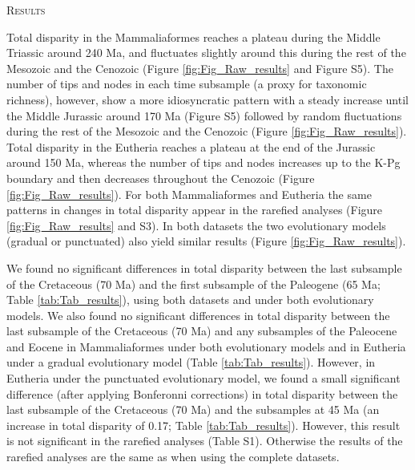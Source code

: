 \documentclass[12pt,letterpaper]{article}
\renewcommand{\section}[1]{%
\bigskip
\begin{center}
\begin{Large}
\normalfont\scshape #1
\medskip
\end{Large}
\end{center}}
\begin{document}
%
%

\section{Results}
Total disparity in the Mammaliaformes reaches a plateau during the Middle Triassic around 240 Ma, and fluctuates slightly around this during the rest of the Mesozoic and the Cenozoic (Figure \ref{fig:Fig_Raw_results} and Figure S5).
The number of tips and nodes in each time subsample (a proxy for taxonomic richness), however, show a more idiosyncratic pattern with a steady increase until the Middle Jurassic around 170 Ma (Figure S5) followed by random fluctuations during the rest of the Mesozoic and the Cenozoic (Figure \ref{fig:Fig_Raw_results}).
Total disparity in the Eutheria reaches a plateau at the end of the Jurassic around 150 Ma, whereas the number of tips and nodes increases up to the K-Pg boundary and then decreases throughout the Cenozoic (Figure \ref{fig:Fig_Raw_results}).
For both Mammaliaformes and Eutheria the same patterns in changes in total disparity appear in the rarefied analyses (Figure \ref{fig:Fig_Raw_results} and S3).
In both datasets the two evolutionary models (gradual or punctuated) also yield similar results (Figure \ref{fig:Fig_Raw_results}).

We found no significant differences in total disparity between the last subsample of the Cretaceous (70 Ma) and the first subsample of the Paleogene (65 Ma; Table \ref{tab:Tab_results}), using both datasets and under both evolutionary models.
We also found no significant differences in total disparity between the last subsample of the Cretaceous (70 Ma) and any subsamples of the Paleocene and Eocene in Mammaliaformes under both evolutionary models and in Eutheria under a gradual evolutionary model (Table \ref{tab:Tab_results}).
However, in Eutheria under the punctuated evolutionary model, we found a small significant difference (after applying Bonferonni corrections) in total disparity between the last subsample of the Cretaceous (70 Ma) and the subsamples at 45 Ma (an increase in total disparity of 0.17; Table \ref{tab:Tab_results}).
However, this result is not significant in the rarefied analyses (Table S1). 
Otherwise the results of the rarefied analyses are the same as when using the complete datasets. 
\end{document}
